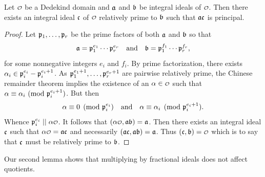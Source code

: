     \begin{lemma}\label{lem:relatively_prime_and_principal}
      Let \(\smc{O}\) be a Dedekind domain and \(\mathfrak{a}\) and \(\mathfrak{b}\) be integral ideals of \(\smc{O}\). Then there exists an integral ideal \(\mathfrak{c}\) of \(\smc{O}\) relatively prime to \(\mathfrak{b}\) such that \(\mathfrak{a}\mathfrak{c}\) is principal.
    \end{lemma}
    \begin{proof}
      Let \(\mathfrak{p}_{1},\ldots,\mathfrak{p}_{r}\) be the prime factors of both \(\mathfrak{a}\) and \(\mathfrak{b}\) so that
      \[
        \mathfrak{a} = \mathfrak{p}_{1}^{e_{1}} \cdots \mathfrak{p}_{r}^{e_{r}} \quad \text{and} \quad \mathfrak{b} = \mathfrak{p}_{1}^{f_{1}} \cdots \mathfrak{p}_{r}^{f_{r}},
      \]
      for some nonnegative integers \(e_{i}\) and \(f_{i}\). By prime factorization, there exists \(\alpha_{i} \in \mathfrak{p}_{i}^{e_{i}}-\mathfrak{p}_{i}^{e_{i}+1}\). As \(\mathfrak{p}_{1}^{e_{1}+1},\ldots,\mathfrak{p}_{r}^{e_{r}+1}\) are pairwise relatively prime, the Chinese remainder theorem implies the existence of an \(\a \in \smc{O}\) such that \(\alpha \equiv \alpha_{i} \ (\mathrm{mod}\text{ }\mathfrak{p}_{i}^{e_{i}+1})\). But then
      \[
        \alpha \equiv 0 \pmod{\mathfrak{p}_{i}^{e_{i}}} \quad \text{and} \quad \alpha \equiv \alpha_{i} \pmod{\mathfrak{p}_{i}^{e_{i}+1}}.
      \]
      Whence \(\mf{p}_{i}^{e_{i}} \mid\mid \a\smc{O}\). It follows that \((\a\smc{O},\mf{a}\mf{b}) = \mf{a}\). Then there exists an integral ideal \(\mathfrak{c}\) such that \(\a\smc{O} = \mf{a}\mf{c}\) and necessarily \((\mathfrak{a}\mathfrak{c},\mathfrak{a}\mathfrak{b}) = \mathfrak{a}\). Thus \((\mf{c},\mf{b}) = \smc{O}\) which is to say that \(\mathfrak{c}\) must be relatively prime to \(\mathfrak{b}\).
    \end{proof}

    Our second lemma shows that multiplying by fractional ideals does not affect quotients.


